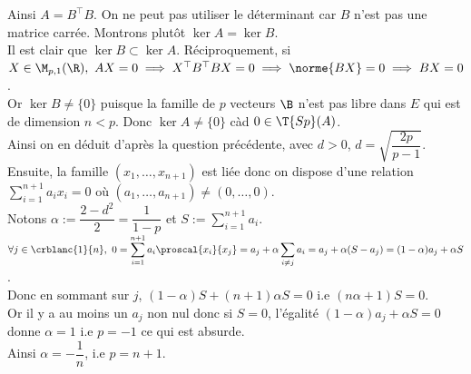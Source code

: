\documentclass[8pt]{book}
\begin{document}
\begin{enumerate}[leftmargin=*]
		Ainsi $A=B^\top B$. On ne peut pas utiliser le déterminant car $B$ n'est pas une matrice carrée. Montrons plutôt $\ker A=\ker B$.\\
		Il est clair que $\ker B\subset \ker A$. Réciproquement, si $X\in \M_{p,1}(\R),\ AX=0\implies X^\top B^\top BX=0\implies \norme{BX}=0\implies BX=0$.\\
		Or $\ker B\ne \{0\}$ puisque la famille de $p$ vecteurs $\B$ n'est pas libre dans $E$ qui est de dimension $n<p$. Donc $\ker A\ne \{0\}$ càd $0\in \T{Sp}(A)$.\\
		Ainsi on en déduit d'après la question précédente, avec $d>0$, $d=\sqrt{\dfrac{2p}{p-1}}$.\\
		Ensuite, la famille $(x_1,\dots,x_{n+1})$ est liée donc on dispose d'une relation $\displaystyle\sum_{i=1}^{n+1}a_ix_i=0$ où $(a_1,\dots,a_{n+1})\ne (0,\dots,0)$.\\
		Notons $\alpha:=\dfrac{2-d^2}{2}=\dfrac{1}{1-p}$ et $S:=\displaystyle\sum_{i=1}^{n+1}a_i$.\\
		$\forall j\in \crblanc{1}{n},\ 0=\displaystyle\sum_{i=1}^{n+1}a_i\proscal{x_i}{x_j}=a_j+\alpha\sum_{i\ne j}a_i=a_j+\alpha(S-a_j)=(1-\alpha)a_j+\alpha S$.\\
		Donc en sommant sur $j$, $(1-\alpha)S+(n+1)\alpha S=0$ i.e $(n\alpha+1)S=0$.\\
		Or il y a au moins un $a_j$ non nul donc si $S=0$, l'égalité $(1-\alpha)a_j+\alpha S=0$ donne $\alpha=1$ i.e $p=-1$ ce qui est absurde.\\
		Ainsi $\alpha=-\dfrac{1}{n}$, i.e $p=n+1$.
	\end{enumerate}
	
\end{document}
